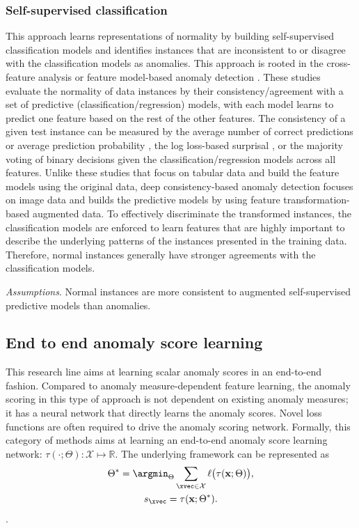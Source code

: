 \subsubsection{Self-supervised classification}
This approach learns representations of normality by building self-supervised classification models and identifies instances that are inconsistent to or disagree with the classification models as anomalies. This approach is rooted in the cross-feature analysis or feature model-based anomaly detection \cite{huang2003consistency,noto2012consisitency,tenenboim2013consistency}. These studies evaluate the normality of data instances by their consistency/agreement with a set of predictive (classification/regression) models, with each model learns to predict one feature based on the rest of the other features. The consistency of a given test instance can be measured by the average number of correct predictions or average prediction probability \cite{huang2003consistency}, the log loss-based surprisal \cite{noto2012consisitency}, or the majority voting of binary decisions \cite{tenenboim2013consistency} given the classification/regression models across all features. Unlike these studies that focus on tabular data and build the feature models using the original data, deep consistency-based anomaly detection focuses on image data and builds the predictive models by using feature transformation-based augmented data. To effectively discriminate the transformed instances, the classification models are enforced to learn features that are highly important to describe the underlying patterns of the instances presented in the training data. Therefore, normal instances generally have stronger agreements with the classification models.

\textit{Assumptions}. Normal instances are more consistent to augmented self-supervised predictive models than anomalies.


\subsection{End to end anomaly score learning}
This research line aims at learning scalar anomaly scores in an end-to-end fashion. Compared to anomaly measure-dependent feature learning, the anomaly scoring in this type of approach is not dependent on existing anomaly measures; it has a neural network that directly learns the anomaly scores. Novel loss functions are often required to drive the anomaly scoring network. Formally, this category of methods aims at learning an end-to-end anomaly score learning network: $\tau(\cdot; \Theta):\mathcal{X} \mapsto \mathbb{R}$. The underlying framework can be represented as
\begin{gather}\label{eqn:scorelearning1}
    \Theta^* = \argmin_{\Theta} \sum_{\xvec \in \mathcal{X}} \ell\big( \tau(\mathbf{x};\Theta) \big),\\
    s_{\xvec} = \tau(\mathbf{x};\Theta^*)\label{eqn:scorelearning2}.
\end{gather}.

